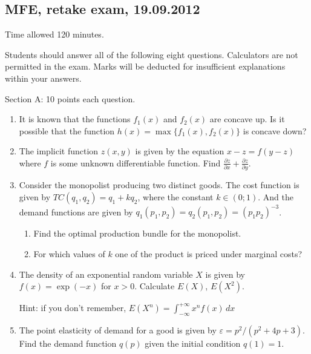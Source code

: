 \documentclass[12pt]{article} %
\theoremstyle{definition} %
\begin{document}
\subsection{MFE, retake exam, 19.09.2012}

Time allowed 120 minutes.

Students should answer all of the following eight questions. Calculators are not permitted in the exam. Marks will be deducted for insufficient explanations within your answers.

Section A: 10 points  each question.
\begin{enumerate}


\item It is known that the functions $f_1(x)$ and $f_2(x)$ are concave up. Is it possible that the function $h(x)=\max\{f_1(x),f_2(x)\}$ is concave down?

\item The implicit function $z(x,y)$ is given by the equation $x-z=f(y-z)$ where $f$ is some unknown differentiable function. Find $\frac{\partial z}{\partial x}+\frac{\partial z}{\partial y}$.
\item Consider the monopolist producing two distinct goods. The cost function is given by $TC(q_1,q_2)=q_1+kq_2$, where the constant $k\in (0;1)$. And the demand functions are given by $q_1(p_1,p_2)=q_2(p_1,p_2)=(p_1p_2)^{-3}$.
\begin{enumerate}
\item Find the optimal production bundle for the monopolist.
\item For which values of $k$ one of the product is priced under marginal costs? %
\end{enumerate}
\item The density of an exponential random variable $X$ is given by $f(x)=\exp(-x)$ for $x>0$. Calculate $E(X)$, $E(X^2)$.

Hint: if you don't remember, $E(X^n)=\int_{-\infty}^{+\infty}x^nf(x)\,dx$
\item The point elasticity of demand for a good is given by $\varepsilon=p^2/(p^2+4p+3)$. Find the demand function $q(p)$ given the initial condition $q(1)=1$.


\end{enumerate}
\end{document}
